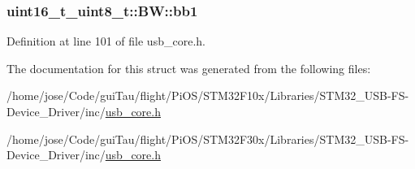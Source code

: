 \hypertarget{structuint16__t__uint8__t_1_1_b_w_a07256d14f7564164013e0dee3a741ab4}{
\subsubsection[{bb1}]{ uint16\-\_\-t\-\_\-uint8\-\_\-t\-::\-B\-W\-::bb1}}\label{structuint16__t__uint8__t_1_1_b_w_a07256d14f7564164013e0dee3a741ab4}


Definition at line 101 of file usb\-\_\-core.\-h.



The documentation for this struct was generated from the following files\-:\begin{DoxyCompactItemize}
\item 
/home/jose/\-Code/gui\-Tau/flight/\-Pi\-O\-S/\-S\-T\-M32\-F10x/\-Libraries/\-S\-T\-M32\-\_\-\-U\-S\-B-\/\-F\-S-\/\-Device\-\_\-\-Driver/inc/\hyperlink{_s_t_m32_f10x_2_libraries_2_s_t_m32___u_s_b-_f_s-_device___driver_2inc_2usb__core_8h}{usb\-\_\-core.\-h}\item 
/home/jose/\-Code/gui\-Tau/flight/\-Pi\-O\-S/\-S\-T\-M32\-F30x/\-Libraries/\-S\-T\-M32\-\_\-\-U\-S\-B-\/\-F\-S-\/\-Device\-\_\-\-Driver/inc/\hyperlink{_s_t_m32_f30x_2_libraries_2_s_t_m32___u_s_b-_f_s-_device___driver_2inc_2usb__core_8h}{usb\-\_\-core.\-h}\end{DoxyCompactItemize}
